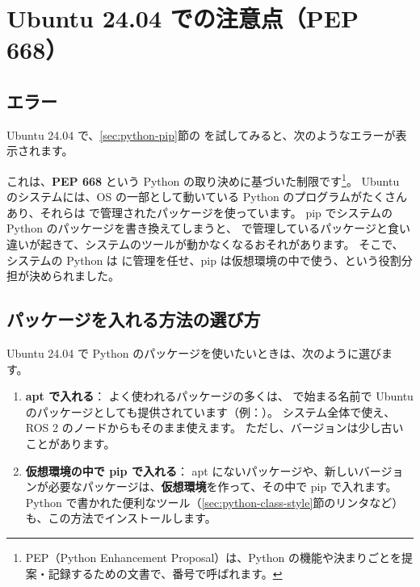 \section{Ubuntu 24.04 での注意点（PEP 668）}
\label{sec:python-pep668}

\subsection{ エラー}

Ubuntu 24.04 で、\ref{sec:python-pip}節の  を試してみると、次のようなエラーが表示されます。


これは、\textbf{PEP 668} という Python の取り決めに基づいた制限です\footnote{PEP（Python Enhancement Proposal）は、Python の機能や決まりごとを提案・記録するための文書で、番号で呼ばれます。}。
Ubuntu のシステムには、OS の一部として動いている Python のプログラムがたくさんあり、それらは  で管理されたパッケージを使っています。
pip でシステムの Python のパッケージを書き換えてしまうと、 で管理しているパッケージと食い違いが起きて、システムのツールが動かなくなるおそれがあります。
そこで、システムの Python は  に管理を任せ、pip は仮想環境の中で使う、という役割分担が決められました。

\subsection{パッケージを入れる方法の選び方}

Ubuntu 24.04 で Python のパッケージを使いたいときは、次のように選びます。

\begin{enumerate}
  \item \textbf{apt で入れる}：
    よく使われるパッケージの多くは、 で始まる名前で Ubuntu のパッケージとしても提供されています（例：）。
    システム全体で使え、ROS 2 のノードからもそのまま使えます。
    ただし、バージョンは少し古いことがあります。
  \item \textbf{仮想環境の中で pip で入れる}：
    apt にないパッケージや、新しいバージョンが必要なパッケージは、\textbf{仮想環境}を作って、その中で pip で入れます。
    Python で書かれた便利なツール（\ref{sec:python-class-style}節のリンタなど）も、この方法でインストールします。
\end{enumerate}

